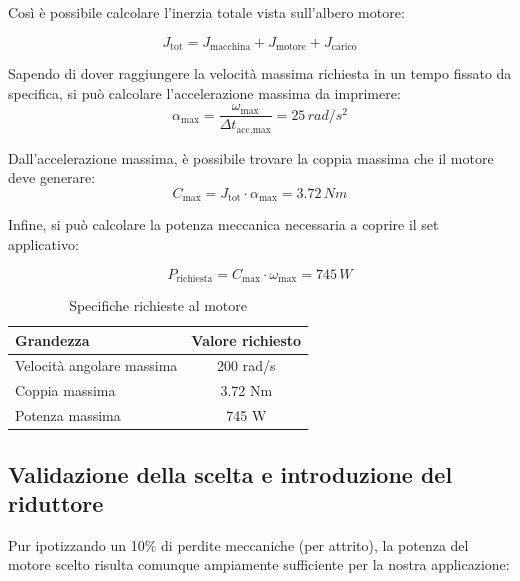 \documentclass[a4paper,12pt]{article}
\begin{document}
\vspace{0.5em}

Così è possibile calcolare l'inerzia totale vista sull'albero motore:

\vspace{0.3em}

\[
    J_{\text{tot}} = J_{\text{macchina}} + J_{\text{motore}} + J_{\text{carico}}
\]

\vspace{0.5em}

Sapendo di dover raggiungere la velocità massima richiesta in un tempo fissato da specifica, si può calcolare l'accelerazione massima da imprimere:
\vspace{0.5em}
\[
    \alpha_{\text{max}} = \frac{\omega_{\text{max}}}{\Delta t_{\text{acc,max}}}=25 \, rad/s^2
\]

\vspace{0.5em}

Dall'accelerazione massima, è possibile trovare la coppia massima che il motore deve generare:
\[
    C_{\text{max}} = J_{\text{tot}} \cdot \alpha_{\text{max}} = 3.72 \,Nm
\]

\vspace{0.5em}
Infine, si può calcolare la potenza meccanica necessaria a coprire il set applicativo:

\[
    P_{\text{richiesta}} = C_{\text{max}} \cdot \omega_{\text{max}} = 745\,W
\]

\vspace{0.5cm}

\begin{table}[h!]
    \centering
    \begin{tabular}{|l|c|}
    \hline
    \textbf{Grandezza} & \textbf{Valore richiesto} \\ \hline
    Velocità angolare massima  & 200 rad/s\quad \\ \hline
    Coppia massima & 3.72 Nm\quad \\ \hline
    Potenza massima & 745 W\quad \\ \hline
    \end{tabular}
    \caption{Specifiche richieste al motore}
\end{table}


\subsection{Validazione della scelta e introduzione del riduttore}

Pur ipotizzando un 10\% di perdite meccaniche (per attrito), la potenza del motore scelto risulta comunque ampiamente sufficiente per la nostra applicazione:
\end{document}
